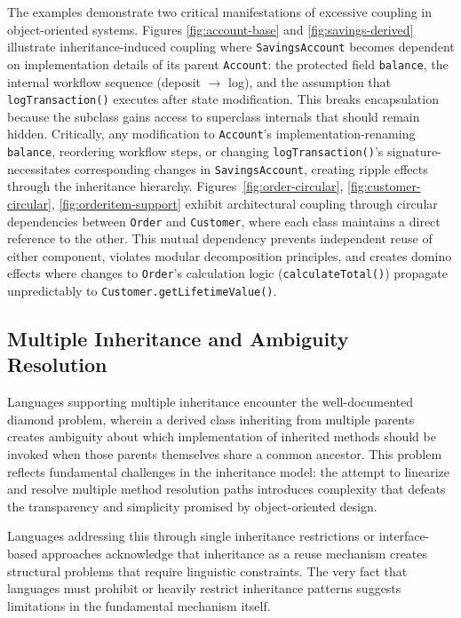 The examples demonstrate two critical manifestations of excessive coupling in object-oriented systems. Figures \ref{fig:account-base} and \ref{fig:savings-derived} illustrate inheritance-induced coupling where \texttt{SavingsAccount} becomes dependent on implementation details of its parent \texttt{Account}: the protected field \texttt{balance}, the internal workflow sequence (deposit $\rightarrow$ log), and the assumption that \texttt{logTransaction()} executes after state modification. This breaks encapsulation because the subclass gains access to superclass internals that should remain hidden. Critically, any modification to \texttt{Account}'s implementation-renaming \texttt{balance}, reordering workflow steps, or changing \texttt{logTransaction()}'s signature-necessitates corresponding changes in \texttt{SavingsAccount}, creating ripple effects through the inheritance hierarchy. Figures~\ref{fig:order-circular}, \ref{fig:customer-circular}, \ref{fig:orderitem-support} exhibit architectural coupling through circular dependencies between \texttt{Order} and \texttt{Customer}, where each class maintains a direct reference to the other. This mutual dependency prevents independent reuse of either component, violates modular decomposition principles, and creates domino effects where changes to \texttt{Order}'s calculation logic (\texttt{calculateTotal()}) propagate unpredictably to \texttt{Customer.getLifetimeValue()}.

\subsection{Multiple Inheritance and Ambiguity Resolution}

Languages supporting multiple inheritance encounter the well-documented diamond problem, wherein a derived class inheriting from multiple parents creates ambiguity about which implementation of inherited methods should be invoked when those parents themselves share a common ancestor. This problem reflects fundamental challenges in the inheritance model: the attempt to linearize and resolve multiple method resolution paths introduces complexity that defeats the transparency and simplicity promised by object-oriented design.

Languages addressing this through single inheritance restrictions or interface-based approaches acknowledge that inheritance as a reuse mechanism creates structural problems that require linguistic constraints. The very fact that languages must prohibit or heavily restrict inheritance patterns suggests limitations in the fundamental mechanism itself.

